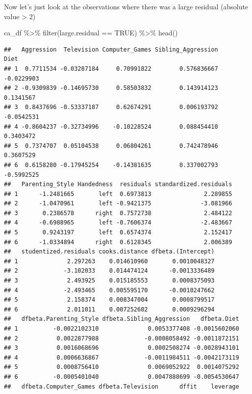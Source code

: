 \documentclass[
]{book}
\newenvironment{Shaded}{\begin{snugshade}}{\end{snugshade}}
\newcommand{\ConstantTok}[1]{\textcolor[rgb]{0.00,0.00,0.00}{#1}}
\newcommand{\FunctionTok}[1]{\textcolor[rgb]{0.00,0.00,0.00}{#1}}
\newcommand{\NormalTok}[1]{#1}
\newcommand{\SpecialCharTok}[1]{\textcolor[rgb]{0.00,0.00,0.00}{#1}}
\begin{document}
Now let's just look at the observations where there was a large residual (absolute value \textgreater{} 2)

\begin{Shaded}
\begin{Highlighting}[]
\NormalTok{ca\_df }\SpecialCharTok{\%\textgreater{}\%} \FunctionTok{filter}\NormalTok{(large.residual }\SpecialCharTok{==} \ConstantTok{TRUE}\NormalTok{) }\SpecialCharTok{\%\textgreater{}\%} \FunctionTok{head}\NormalTok{()}
\end{Highlighting}
\end{Shaded}

\begin{verbatim}
##   Aggression  Television Computer_Games Sibling_Aggression       Diet
## 1  0.7711534 -0.03287184     0.70991822        0.576836667 -0.0229903
## 2 -0.9309839 -0.14695730     0.58503832        0.143914123  0.1341567
## 3  0.8437696 -0.53337187     0.62674291        0.006193792 -0.0542531
## 4 -0.8604237 -0.32734996    -0.10228524        0.088454410  0.3403472
## 5  0.7374707  0.05104538     0.06804261        0.742478946  0.3607529
## 6  0.6158280 -0.17945254    -0.14381635        0.337002793 -0.5992525
##   Parenting_Style Handedness  residuals standardized.residuals
## 1      -1.2481665       left  0.6973813               2.289855
## 2      -1.0470961       left -0.9421375              -3.081966
## 3       0.2386578      right  0.7572738               2.484122
## 4      -0.6988965       left -0.7606374              -2.483667
## 5       0.9243197       left  0.6574374               2.152417
## 6      -1.0334894      right  0.6128345               2.006389
##   studentized.residuals cooks.distance dfbeta.(Intercept)
## 1              2.297263    0.014610960       0.0010048327
## 2             -3.102033    0.014474124      -0.0013336489
## 3              2.493925    0.015185553       0.0008375093
## 4             -2.493465    0.005595170      -0.0010247662
## 5              2.158374    0.008347004       0.0008799517
## 6              2.011011    0.007252602       0.0009296294
##   dfbeta.Parenting_Style dfbeta.Sibling_Aggression   dfbeta.Diet
## 1          -0.0022102310              0.0053377408 -0.0015602060
## 2           0.0022877988             -0.0008058492 -0.0011872151
## 3           0.0016068696              0.0002508274 -0.0028943101
## 4           0.0006636867             -0.0011984511 -0.0042173119
## 5           0.0008756410              0.0069052922  0.0014075292
## 6          -0.0005401040              0.0047888699 -0.0054530647
##   dfbeta.Computer_Games dfbeta.Television      dffit    leverage

\end{verbatim}
\end{document}
